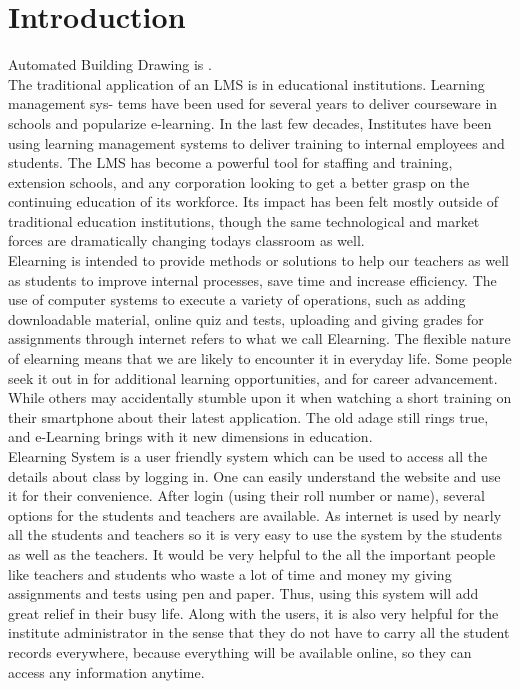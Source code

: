 \section{Introduction}
Automated Building Drawing is .\\

\noindent The traditional application of an LMS is in educational institutions. Learning management sys-
tems have been used for several years to deliver courseware in schools and popularize e-learning. In
the last few decades, Institutes have been using learning management systems to deliver training
to internal employees and students. The LMS has become a powerful tool for staffing and training,
extension schools, and any corporation looking to get a better grasp on the continuing education of
its workforce. Its impact has been felt mostly outside of traditional education institutions, though
the same technological and market forces are dramatically changing todays classroom as well.\\

\noindent Elearning is intended to provide methods or solutions to help our teachers as well as students
to improve internal processes, save time and increase efficiency. The use of computer systems to execute a variety of operations, such as adding downloadable
material, online quiz and tests, uploading and giving grades for assignments through internet
refers to what we call Elearning. The flexible nature of elearning means that we are likely to
encounter it in everyday life. Some people seek it out in for additional learning opportunities, and
for career advancement. While others may accidentally stumble upon it when watching a short
training on their smartphone about their latest application. The old adage still rings true, and
e-Learning brings with it new dimensions in education.\\

\noindent Elearning System is a user friendly system which can be used to access all the details about class by logging in. One can easily understand the website and use it for their convenience.
After login (using their roll number or name), several options for the students and teachers are available. As internet is used by nearly all the students and teachers so it is
very easy to use the system by the students as well as the teachers. It would be very helpful to the all the important people like
teachers and students who waste a lot of time and money my giving assignments and tests using pen and paper. Thus, using this system will add great relief in their busy life.
Along with the users, it is also very helpful for the institute administrator in the sense that they do
not have to carry all the student records everywhere, because everything will be available online, so they can access any information anytime.

